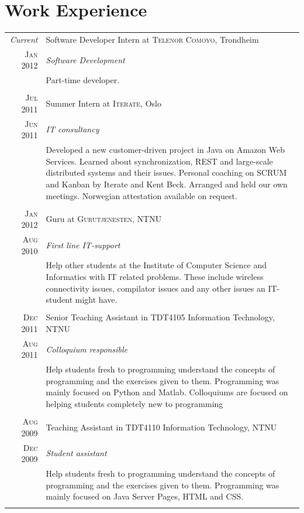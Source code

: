 \documentclass[a4paper,10pt]{article}
\begin{document}
\section{Work Experience}
\begin{tabular}{r|p{12cm}}
  \emph{Current} & Software Developer Intern at \textsc{Telenor Comoyo}, Trondheim \\\textsc{Jan 2012}&\emph{Software Development}\\&\footnotesize{Part-time developer.}\\\multicolumn{2}{c}{} \\
  \textsc{Jul 2011} & Summer Intern at \textsc{Iterate}, Oslo \\\textsc{Jun 2011}&\emph{IT consultancy}\\&\footnotesize{Developed a new customer-driven project in Java on Amazon Web Services. Learned about synchronization, REST and large-scale distributed systems and their issues. Personal coaching on SCRUM and Kanban by Iterate and Kent Beck. Arranged and held our own meetings. Norwegian attestation available on request.}\\\multicolumn{2}{c}{} \\
  \textsc{Jan 2012} & Guru at \textsc{Gurutjenesten}, NTNU  \\\textsc{Aug 2010}&\emph{First line IT-support}\\&\footnotesize{Help other students at the Institute of Computer Science and Informatics with IT related problems. These include wireless connectivity issues, compilator issues and any other issues an IT-student might have.}\\\multicolumn{2}{c}{} \\
  \textsc{Dec 2011} & Senior Teaching Assistant in TDT4105 Information Technology, NTNU  \\\textsc{Aug 2011}&\emph{Colloquium responsible}\\&\footnotesize{Help students fresh to programming understand the concepts of programming and the exercises given to them. Programming was mainly focused on Python and Matlab. Colloquiums are focused on helping students completely new to programming }\\\multicolumn{2}{c}{} \\
  \textsc{Aug 2009} & Teaching Assistant in TDT4110 Information Technology, NTNU  \\\textsc{Dec 2009}&\emph{Student assistant}\\&\footnotesize{Help students fresh to programming understand the concepts of programming and the exercises given to them. Programming was mainly focused on Java Server Pages, HTML and CSS.}\\\multicolumn{2}{c}{} \\

\end{tabular}
\end{document}
